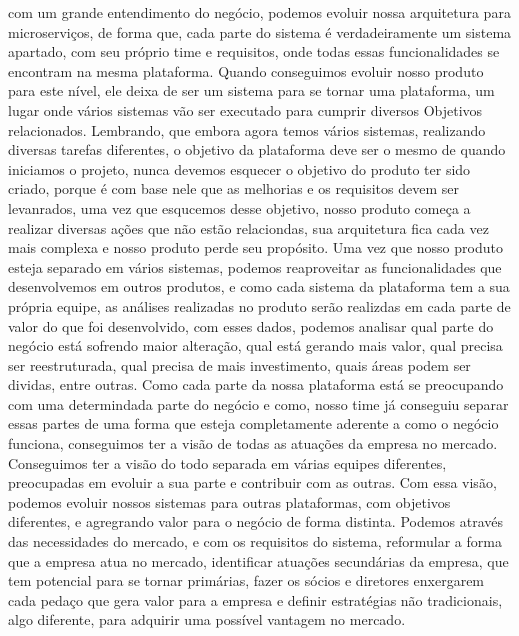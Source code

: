       com um grande entendimento do negócio, podemos evoluir nossa arquitetura para
      microserviços, de forma que, cada parte do sistema é verdadeiramente um sistema
      apartado, com seu próprio time e requisitos, onde todas essas funcionalidades
      se encontram na mesma plataforma. Quando conseguimos evoluir nosso produto
      para este nível, ele deixa de ser um sistema para se tornar uma plataforma,
      um lugar onde vários sistemas vão ser executado para cumprir diversos Objetivos
      relacionados. Lembrando, que embora agora temos vários sistemas, realizando
      diversas tarefas diferentes, o objetivo da plataforma deve ser o mesmo de
      quando iniciamos o projeto, nunca devemos esquecer o objetivo do produto ter
      sido criado, porque é com base nele que as melhorias e os requisitos devem ser
      levanrados, uma vez que esqucemos desse objetivo, nosso produto começa a
      realizar diversas ações que não estão relaciondas, sua arquitetura fica cada
      vez mais complexa e nosso produto perde seu propósito. \newline
      Uma vez que nosso produto esteja separado em vários sistemas, podemos reaproveitar
      as funcionalidades que desenvolvemos em outros produtos, e como cada sistema
      da plataforma tem a sua própria equipe, as análises realizadas no produto
      serão realizdas em cada parte de valor do que foi desenvolvido, com esses
      dados, podemos analisar qual parte do negócio está sofrendo maior alteração,
      qual está gerando mais valor, qual precisa ser reestruturada, qual precisa
      de mais investimento, quais áreas podem ser dividas, entre outras. Como
      cada parte da nossa plataforma está se preocupando com uma determindada parte
      do negócio e como, nosso time já conseguiu separar essas partes de uma forma
      que esteja completamente aderente a como o negócio funciona, conseguimos ter
      a visão de todas as atuações da empresa no mercado. Conseguimos ter a visão
      do todo separada em várias equipes diferentes, preocupadas em evoluir a sua
      parte e contribuir com as outras. Com essa visão, podemos evoluir nossos
      sistemas para outras plataformas, com objetivos diferentes, e agregrando
      valor para o negócio de forma distinta. Podemos através das necessidades do
      mercado, e com os requisitos do sistema, reformular a forma que a empresa
      atua no mercado, identificar atuações secundárias da empresa, que tem potencial
      para se tornar primárias, fazer os sócios e diretores enxergarem cada pedaço
      que gera valor para a empresa e definir estratégias não tradicionais, algo
      diferente, para adquirir uma possível vantagem no mercado.

